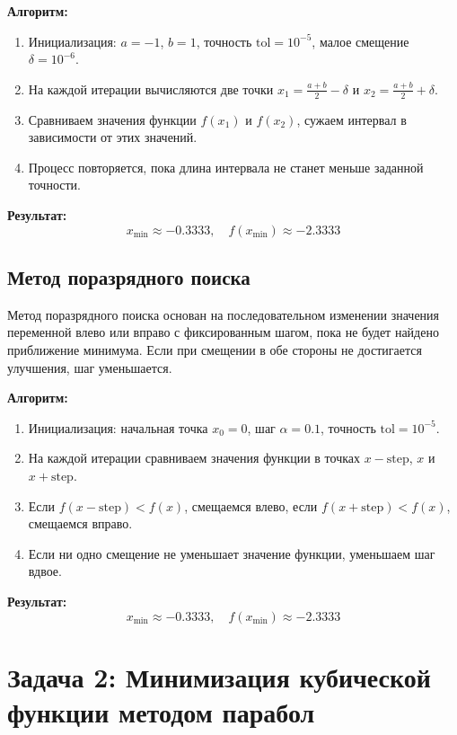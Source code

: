 \documentclass[a4paper,12pt]{article}
\begin{document}
\textbf{Алгоритм:}
\begin{enumerate}
    \item Инициализация: \( a = -1 \), \( b = 1 \), точность \( \text{tol} = 10^{-5} \), малое смещение \( \delta = 10^{-6} \).
    \item На каждой итерации вычисляются две точки \( x_1 = \frac{a + b}{2} - \delta \) и \( x_2 = \frac{a + b}{2} + \delta \).
    \item Сравниваем значения функции \( f(x_1) \) и \( f(x_2) \), сужаем интервал в зависимости от этих значений.
    \item Процесс повторяется, пока длина интервала не станет меньше заданной точности.
\end{enumerate}

\textbf{Результат:}
\[
x_{\text{min}} \approx -0.3333, \quad f(x_{\text{min}}) \approx -2.3333
\]

\subsection{Метод поразрядного поиска}

Метод поразрядного поиска основан на последовательном изменении значения переменной влево или вправо с фиксированным шагом, пока не будет найдено приближение минимума. Если при смещении в обе стороны не достигается улучшения, шаг уменьшается.

\textbf{Алгоритм:}
\begin{enumerate}
    \item Инициализация: начальная точка \( x_0 = 0 \), шаг \( \alpha = 0.1 \), точность \( \text{tol} = 10^{-5} \).
    \item На каждой итерации сравниваем значения функции в точках \( x - \text{step} \), \( x \) и \( x + \text{step} \).
    \item Если \( f(x - \text{step}) < f(x) \), смещаемся влево, если \( f(x + \text{step}) < f(x) \), смещаемся вправо.
    \item Если ни одно смещение не уменьшает значение функции, уменьшаем шаг вдвое.
\end{enumerate}

\textbf{Результат:}
\[
x_{\text{min}} \approx -0.3333, \quad f(x_{\text{min}}) \approx -2.3333
\]

\section{Задача 2: Минимизация кубической функции методом парабол}
\end{document}
